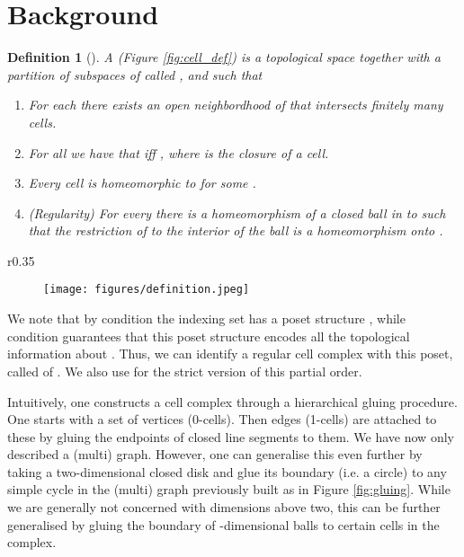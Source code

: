 \documentclass{article}
\newcommand{\define}[1]{{\bf \boldmath{#1}}}
\newtheorem{definition}[theorem]{Definition}
\begin{document}
\section{Background}

\begin{definition}[\citet{HGh19}]
A \define{regular cell complex} (Figure \ref{fig:cell_def}) is a topological space  together with a partition  of subspaces  of  called \define{cells}, and such that
\begin{enumerate}[leftmargin=*,topsep=0pt,itemsep=-0.5ex]
    \item  For each  there exists an open neighbordhood of  that intersects finitely many cells.
\item  For all  we have that  iff , where  is the closure of a cell. 
\item Every cell is homeomorphic to  for some .
\item  ({\em Regularity}) For every  there is a homeomorphism  of a closed ball in  to  such that the restriction of  to the  interior of the ball is a homeomorphism onto .
\end{enumerate}
\end{definition}

\begin{wrapfigure}{r}{0.35\textwidth}
    \centering
    \vspace{-15pt}
    \begin{subfigure}[b]{1.0\linewidth}
        \centering
        \texttt{[image: figures/definition.jpeg]}
\label{fig:y equals x}
     \end{subfigure}\hspace{3mm}
    \vspace{-23pt}
    \caption{A cell complex  and the corresponding homeomorphisms to the closed balls for three cells of different dimensions in the complex.}
    \label{fig:cell_def}
    \vspace{-20pt}
\end{wrapfigure}






We note that by  condition  the indexing set  has a poset structure ,
while condition  guarantees that this poset structure encodes all the topological information about . Thus, we can identify a regular cell complex  with this poset, called \define{face poset} of . We also use  for the strict version of this partial order.  

Intuitively, one constructs a cell complex through a hierarchical gluing procedure. One starts with a set of vertices (0-cells). Then edges (1-cells) are attached to these by gluing the endpoints of closed line segments to them. We have now only described a (multi) graph. However, one can generalise this even further by taking a two-dimensional closed disk and glue its boundary (i.e. a circle) to any simple cycle in the (multi) graph previously built as in Figure \ref{fig:gluing}. While we are generally not concerned with dimensions above two, this can be further generalised by gluing the boundary of -dimensional balls to certain cells in the complex. 
\end{document}
